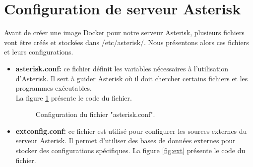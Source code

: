 \section{Configuration de serveur Asterisk}
Avant de créer une image Docker pour notre serveur Asterisk, plusieurs fichiers vont être créés et stockées dans /etc/asterisk/. Nous présentons alors ces fichiers et leurs configurations.
\begin{itemize}
    \item \textbf{asterisk.conf:}  ce fichier définit les variables nécessaires à l’utilisation d’Asterisk. Il sert à guider
Asterisk où il doit chercher certains fichiers et les programmes exécutables.\\ La figure \ref{fig:ast} présente le code du fichier.
   \begin{figure}[H]
        \centering
        \caption{Configuration du fichier "asterisk.conf".}
        \label{fig:ast}
    \end{figure}
    \item \textbf{extconfig.conf:} ce fichier est utilisé pour configurer les sources externes du serveur Asterisk. Il permet d’utiliser des bases de données externes pour stocker des configurations spécifiques. La figure \ref{fig:ext} présente le code du fichier.
   \begin{figure}[H]
        \centering

\end{figure}
\end{itemize}
